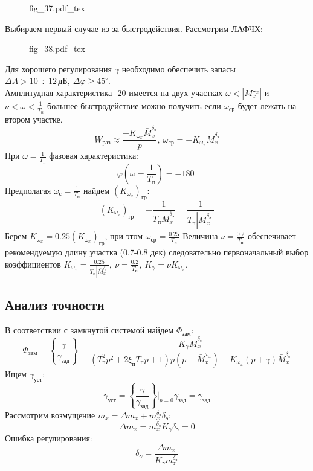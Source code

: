 \documentclass{article}
\begin{document}
\begin{figure}[H]
    \centering
    {fig_37.pdf_tex}
\end{figure}
Выбираем первый случае из-за быстродействия.
Рассмотрим ЛАФЧХ:
\begin{figure}[H]
    \centering
    {fig_38.pdf_tex}
\end{figure}

Для хорошего регулирования $\gamma$ необходимо обеспечить запасы $\Delta A > 10
\div 12 \, \text{дБ},\ \Delta \varphi \geq 45^\circ$.\\
Амплитудная характеристика -20 имеется на двух участках $\omega <
|M_x^{\omega_x}|$ и $\nu < \omega <\frac{1}{T_n}$ большее быстродействие можно
получить если $\omega_\text{ср}$ будет лежать на втором участке.
\[
    W_\text{раз} \approx \frac{-K_{\omega_x} \bar{M}_x^{\delta_\text{э}}}{p},\
    \omega_\text{ср} = -K_{\omega_x} \bar{M}_x^{\delta_\text{э}}
\]
При $\omega = \frac{1}{T_\text{п}}$ фазовая характеристика:
\[
    \varphi(\omega=\frac{1}{T_\text{п}}) = -180^\circ
\]
Предполагая $\omega_\text{с} = \frac{1}{T_\text{п}}$ найдем
$(K_{\omega_x})_\text{гр}$:
\[
    (K_{\omega_x})_\text{гр} = -\frac{1}{T_\text{п}
    \bar{M}_x^{\delta_\text{э}}} = \frac{1}{T_\text{п}
|\bar{M}_x^{\delta_\text{э}}|}
\]
Берем $K_{\omega_x} = 0.25(K_{\omega_x})_\text{гр}$, при этом $\omega_\text{ср}
= \frac{0.25}{T_\text{п}}$
Величина $\nu =\frac{0.2}{T_\text{п}}$ обеспечивает рекомендуемую длину участка
(0.7-0.8 дек) следовательно первоначальный выбор коэффициентов $K_{\omega_x}
=\frac{0.25}{T_\text{п} |\bar{M}_x^{\delta_\text{э}}|}, \ \nu=
\frac{0.2}{T_\text{п}},\ K_\gamma = \nu K_{\omega_x}$.

\subsection{Анализ точности}
В соответствии с замкнутой системой найдем $\Phi_\text{зам}$:
\[
    \Phi_\text{зам} =\left\{\frac{\gamma}{\gamma_\text{зад}}\right\} =
    \frac{K_\gamma \bar{M}_x^{\delta_\text{э}}}{(T_\text{п}^2 p^2 + 2
    \xi_\text{п} T_\text{п} p + 1)p(p - \bar{M}_x^{\omega_x}) - K_{\omega_x}(p
+ \gamma)\bar{M}_x^{\delta_\text{э}}}
\]
Ищем $\gamma_\text{уст}$:
\[ \gamma_\text{уст} = \left\{\frac{\gamma}{\gamma_\text{зад}}\right\}\Big|_{p
= 0} \gamma_\text{зад} = \gamma_\text{зад} \]
Рассмотрим возмущение $m_x = \Delta m_x + m_x^{\delta_\text{э}}
\delta_\text{э}$:
\[
    \Delta m_x = m_x^{\delta_\text{э}} K_\gamma \delta_\gamma = 0
\]
Ошибка регулирования:
\[
    \delta_\gamma =\frac{\Delta m_x}{K_\gamma m_z^{\delta_\text{э}}}
\]
\end{document}
